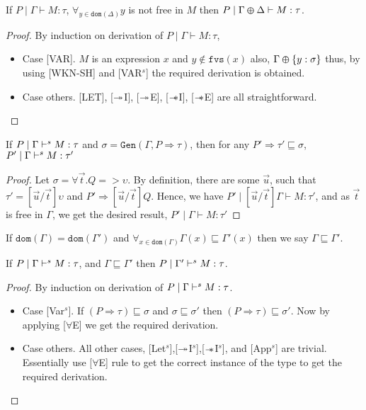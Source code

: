 \begin{lemma}\label{lemma:WKN-SH-helper}
  If $P \mid \Gamma \vdash M:\tau$, $\forall_{y \in \texttt{dom}(\Delta)} y$ is not free in $M$ then $P \mid \Gamma \varoplus \Delta \vdash M:\tau$.
\end{lemma}
\begin{proof}
  By induction on derivation of $P \mid \Gamma \vdash M:\tau$,
  \begin{itemize}
  \item{Case [VAR].} $M$ is an expression $x$ and $y \notin \texttt{fvs}(x)$ also, $\Gamma \varoplus \{y:\sigma\}$ thus, by using
    [WKN-SH] and [VAR$^s$] the required derivation is obtained.
  \item{Case others.}  [LET], [$\twoheadrightarrow$I], [$\twoheadrightarrow$E], [$\mathrel{-\mkern-6mu*}$I], [$\mathrel{-\mkern-6mu*}$E] are all straightforward.\qedhere
  \end{itemize}
\end{proof}

\begin{lemma}\label{lemma:impl-helper}
  If $P \mid \Gamma \vdash^s M:\tau$ and $\sigma = \texttt{Gen}(\Gamma, P \Rightarrow \tau)$,
  then for any $P' \Rightarrow \tau' \sqsubseteq \sigma$, $P' \mid \Gamma \vdash^s M:\tau' $
\end{lemma}
\begin{proof}
  Let $\sigma = \forall \vec{t}. Q => \upsilon$. By definition, there are some $\vec{u}$, such that
  $\tau' = [\vec{u}/\vec{t}]\upsilon$ and $P' \Rightarrow [\vec{u}/\vec{t}]Q$. Hence, we have
  $P' \mid [\vec{u}/\vec{t}]\Gamma \vdash M :\tau'$, and as $\vec{t}$ is free in $\Gamma$, we get the
  desired result, $P' \mid \Gamma \vdash M:\tau'$\qedhere
\end{proof}

\begin{defn}
  If $\texttt{dom}(\Gamma) = \texttt{dom}(\Gamma')$ and $\forall_{x \in \texttt{dom}(\Gamma)} \Gamma(x) \sqsubseteq \Gamma'(x)$
  then we say $\Gamma \sqsubseteq \Gamma'$.
\end{defn}

\begin{lemma}\label{lemma:let-helper}
  If $P \mid \Gamma \vdash^s M: \tau$, and $\Gamma \sqsubseteq \Gamma'$ then $P \mid \Gamma' \vdash^s M:\tau$.
\end{lemma}
\begin{proof}
  By induction on derivation of $P \mid \Gamma \vdash^s M: \tau$.
  \begin{itemize}
  \item{Case [Var$^s$].} If $(P \Rightarrow \tau) \sqsubseteq \sigma$ and $\sigma \sqsubseteq \sigma'$ then $(P \Rightarrow \tau) \sqsubseteq \sigma'$.
    Now by applying [$\forall$E] we get the required derivation.
  \item{Case others.} All other cases, [Let$^s$],[$\twoheadrightarrow$I$^s$],[$\mathrel{-\mkern-6mu*}$I$^s$], and [App$^s$] are trivial.
    Essentially use [$\forall$E] rule to get the correct instance of the type to get the required derivation.\qedhere
  \end{itemize}
\end{proof}

